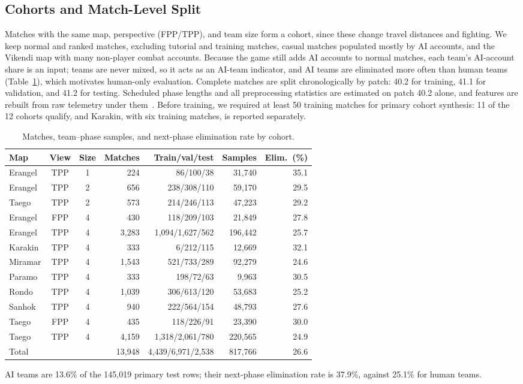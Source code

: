 \documentclass[sigconf,anonymous]{acmart}
\begin{document}
\subsection{Cohorts and Match-Level Split}
\label{sec:method:cohort}
Matches with the same map, perspective (FPP/TPP), and team size form a cohort, since these change travel distances and fighting. We keep normal and ranked matches, excluding tutorial and training matches, casual matches populated mostly by AI accounts, and the Vikendi map with many non-player combat accounts. Because the game still adds AI accounts to normal matches, each team's AI-account share is an input; teams are never mixed, so it acts as an AI-team indicator, and AI teams are eliminated more often than human teams (Table~\ref{tab:cohorts}), which motivates human-only evaluation. Complete matches are split chronologically by patch: 40.2 for training, 41.1 for validation, and 41.2 for testing. Scheduled phase lengths and all preprocessing statistics are estimated on patch 40.2 alone, and features are rebuilt from raw telemetry under them~\cite{Kaufman12}. Before training, we required at least 50 training matches for primary cohort synthesis: 11 of the 12 cohorts qualify, and Karakin, with six training matches, is reported separately.

\begin{table}[t]
\centering
\caption{Matches, team--phase samples, and next-phase elimination rate by cohort.}
\label{tab:cohorts}
\scriptsize
\setlength{\tabcolsep}{2.7pt}
\begin{tabular}{lccrrrr}
\hline
Map & View & Size & Matches & Train/val/test & Samples & Elim.\ (\%) \\
\hline
Erangel & TPP & 1 & 224 & 86/100/38 & 31,740 & 35.1 \\
Erangel & TPP & 2 & 656 & 238/308/110 & 59,170 & 29.5 \\
Taego & TPP & 2 & 573 & 214/246/113 & 47,223 & 29.2 \\
Erangel & FPP & 4 & 430 & 118/209/103 & 21,849 & 27.8 \\
Erangel & TPP & 4 & 3,283 & 1,094/1,627/562 & 196,442 & 25.7 \\
Karakin & TPP & 4 & 333 & 6/212/115 & 12,669 & 32.1 \\
Miramar & TPP & 4 & 1,543 & 521/733/289 & 92,279 & 24.6 \\
Paramo & TPP & 4 & 333 & 198/72/63 & 9,963 & 30.5 \\
Rondo & TPP & 4 & 1,039 & 306/613/120 & 53,683 & 25.2 \\
Sanhok & TPP & 4 & 940 & 222/564/154 & 48,793 & 27.6 \\
Taego & FPP & 4 & 435 & 118/226/91 & 23,390 & 30.0 \\
Taego & TPP & 4 & 4,159 & 1,318/2,061/780 & 220,565 & 24.9 \\
\hline
Total & & & 13,948 & 4,439/6,971/2,538 & 817,766 & 26.6 \\
\hline
\end{tabular}
\smallskip
\parbox{\columnwidth}{\scriptsize AI teams are 13.6\% of the 145,019 primary test rows; their next-phase elimination rate is 37.9\%, against 25.1\% for human teams.}
\end{table}
\end{document}
